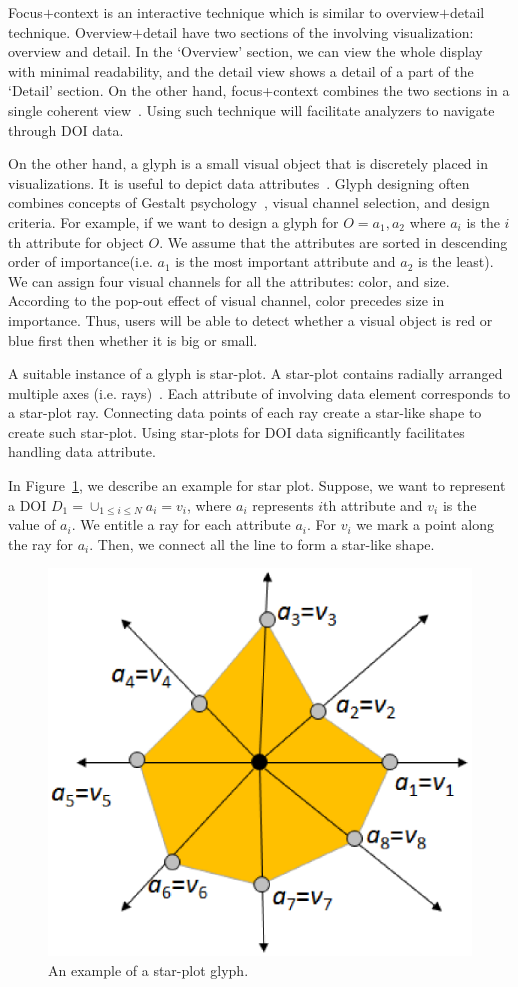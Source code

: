 Focus$+$context is an interactive technique which is similar to overview$+$detail technique. Overview$+$detail have two sections of the involving visualization: overview and detail. In the `Overview' section, we can view the whole display with minimal readability, and the detail view shows a detail of a part of the `Detail' section. On the other hand, focus+context combines the two sections in a single coherent view~\cite{spence1982data}. Using such technique will facilitate analyzers to navigate through DOI data. 

On the other hand, a glyph is a small visual object that is discretely placed in visualizations. It is useful to depict data attributes~\cite{borgo2013glyph}. Glyph designing often combines concepts of Gestalt psychology~\cite{kohler1970gestalt}, visual channel selection, and design criteria. For example, if we want to design a glyph for $O = {a_1, a_2}$ where $a_i$ is the $i$th attribute for object $O$. We assume that the attributes are sorted in descending order of importance(i.e. $a_1$ is the most important attribute and $a_2$ is the least). We can assign four visual channels for all the attributes: color, and size. According to the pop-out effect of visual channel, color precedes size in importance. Thus, users will be able to detect whether a visual object is red or blue first then whether it is big or small. 

A suitable instance of a glyph is star-plot. A star-plot contains radially arranged multiple axes (i.e. rays)~\cite{klippel2009star}. Each attribute of involving data element corresponds to a star-plot ray. Connecting data points of each ray create a star-like shape to create such star-plot. Using star-plots for DOI data significantly facilitates handling data attribute. 

In Figure~\ref{fig:StarplotExample}, we describe an example for star plot. Suppose, we want to represent a DOI $D_1=\cup_{1 \leq i \leq N}a_i=v_i $, where $a_i$ represents $i$th attribute and $v_i$ is the value of $a_i$. We entitle a ray for each attribute $a_i$. For $v_i$ we mark a point along the ray for $a_i$. Then, we connect all the line to form a star-like shape.  
\begin{figure}[htbp]
  \centering
  \includegraphics[width=0.5\linewidth]{images/StarplotExample.eps}
  \caption{An example of a star-plot glyph.}
	\label{fig:StarplotExample}
\end{figure}

